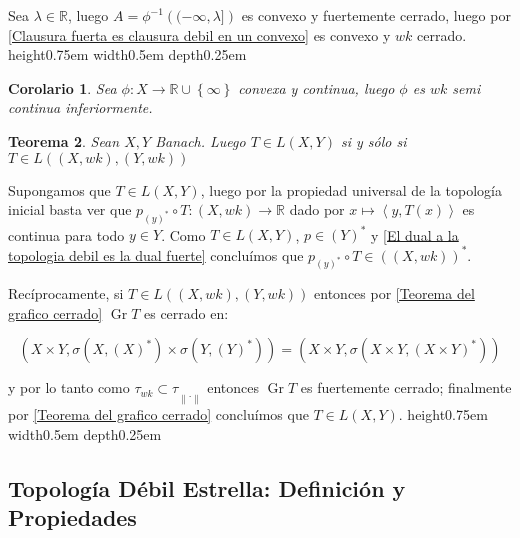 \documentclass[11pt]{article}
\newcommand{\R}{{\mathbb{R}}}
\newcommand{\dual}[1]{\left(#1\right)^{\ast}}
\newcommand{\norm}[1]{\left\lVert#1\right\rVert}
\newcommand{\ip}[1]{\left\langle#1\right\rangle}
\newcommand{\sett}[1]{\left\lbrace#1\right\rbrace}
\DeclareMathOperator{\graf}{Gr}
\newtheorem{theorem}{Teorema}
\numberwithin{theorem}{subsection}
\newtheorem{corollary}[theorem]{Corolario}
\newenvironment{proof}[1][Demostraci\'on]{\begin{trivlist}
		\item[\hskip \labelsep {\bfseries #1}]}{\end{trivlist}}
\newcommand{\qed}{\nobreak \ifvmode \relax \else
	\ifdim\lastskip<1.5em \hskip-\lastskip
	\hskip1.5em plus0em minus0.5em \fi \nobreak
	\vrule height0.75em width0.5em depth0.25em\fi}
\begin{document}
\begin{proof}
	Sea $\lambda \in \R$, luego $A = \phi^{-1}\left((-\infty, \lambda]\right)$ es convexo y fuertemente cerrado, luego por \ref{Clausura fuerta es clausura debil en un convexo} es convexo y $wk$ cerrado. \qed
	
\end{proof}

\begin{corollary}
	\label{Convexa y fuertemente continua es debilmente semicontinua inferiormente}
	Sea $\phi : X \rightarrow \R \cup \sett{\infty}$ convexa y continua, luego $\phi$ es $wk$ semi continua inferiormente.
\end{corollary}

\begin{theorem}
	\label{T es fuerte-fuerte continua entonces es debil-debil continua}
	Sean $X,Y$ Banach. Luego $T \in L(X,Y)$ si y s\'olo si $T \in L(\left(X,wk\right),\left(Y,wk\right))$
\end{theorem}

\begin{proof}
	Supongamos que $T \in L(X,Y)$, luego por la propiedad universal de la topolog\'ia inicial basta ver que $p_{\dual{y}} \circ T : \left(X,wk\right) \rightarrow \R$ dado por $x \mapsto \ip{y,T(x)}$ es continua para todo $y \in Y$. Como $T \in L(X,Y)$, $p\in \dual{Y}$ y \ref{El dual a la topologia debil es la dual fuerte} conclu\'imos que $p_{\dual{y}} \circ T \in \dual{\left(X,wk\right)}$.
	
	Rec\'iprocamente, si $T \in L(\left(X,wk\right),\left(Y,wk\right))$ entonces por \ref{Teorema del grafico cerrado} $\graf T$ es cerrado en:
	
	\begin{equation*}
	\left(X \times Y, \sigma(X,\dual{X}) \times \sigma\left(Y,\dual{Y}\right)\right) = \left(X \times Y, \sigma(X \times Y,\dual{X \times Y})\right)
	\end{equation*}
	
	y por lo tanto como $\tau_{wk} \subset \tau_{\norm{.}}$ entonces $\graf T$ es fuertemente cerrado; finalmente por \ref{Teorema del grafico cerrado} conclu\'imos que $T \in L(X,Y)$. \qed
\end{proof}

\subsection{Topolog\'ia D\'ebil Estrella: Definici\'on y Propiedades}
\end{document}
